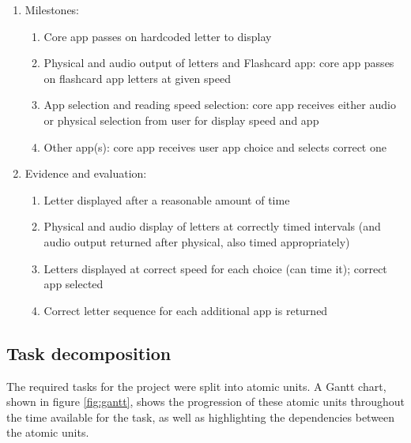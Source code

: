 \documentclass{article}
\begin{document}
\begin{enumerate}
  \item Milestones:
  \begin{enumerate}
    \item Core app passes on hardcoded letter to display
    \item Physical and audio output of letters and Flashcard app: core app passes on flashcard app letters at given speed
    \item App selection and reading speed selection: core app receives either audio or physical selection from user for display speed and app
    \item Other app(s): core app receives user app choice and selects correct one
  \end{enumerate}
  \item Evidence and evaluation:
  \begin{enumerate}
    \item Letter displayed after a reasonable amount of time
    \item Physical and audio display of letters at correctly timed intervals (and audio output returned after physical, also timed appropriately)
    \item Letters displayed at correct speed for each choice (can time it); correct app selected
    \item Correct letter sequence for each additional app is returned
  \end{enumerate}
\end{enumerate}


\subsection{Task decomposition}

The required tasks for the project were split into atomic units. A Gantt chart, shown in figure \ref{fig:gantt}, shows the progression of these atomic units throughout the time available for the task, as well as highlighting the dependencies between the atomic units.
\end{document}
